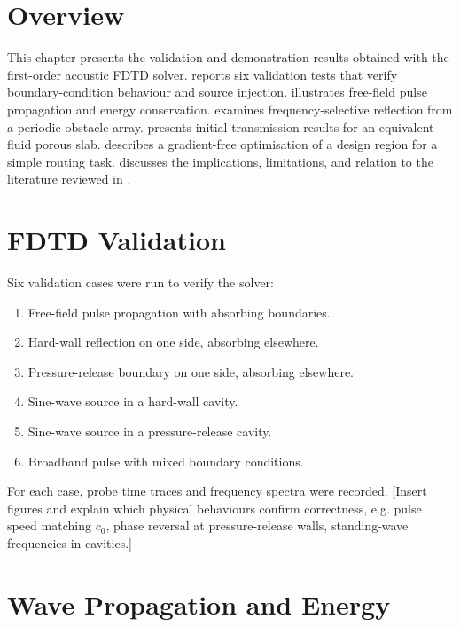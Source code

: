 
\section{Overview}
\label{sec:res_overview}

This chapter presents the validation and demonstration results obtained with the first-order acoustic FDTD solver.  reports six validation tests that verify boundary-condition behaviour and source injection.  illustrates free-field pulse propagation and energy conservation.  examines frequency-selective reflection from a periodic obstacle array.  presents initial transmission results for an equivalent-fluid porous slab.  describes a gradient-free optimisation of a design region for a simple routing task.  discusses the implications, limitations, and relation to the literature reviewed in .

\section{FDTD Validation}
\label{sec:validation}

Six validation cases were run to verify the solver:
\begin{enumerate}
    \item Free-field pulse propagation with absorbing boundaries.
    \item Hard-wall reflection on one side, absorbing elsewhere.
    \item Pressure-release boundary on one side, absorbing elsewhere.
    \item Sine-wave source in a hard-wall cavity.
    \item Sine-wave source in a pressure-release cavity.
    \item Broadband pulse with mixed boundary conditions.
\end{enumerate}

For each case, probe time traces and frequency spectra were recorded. [Insert figures and explain which physical behaviours confirm correctness, e.g. pulse speed matching $c_0$, phase reversal at pressure-release walls, standing-wave frequencies in cavities.]

\section{Wave Propagation and Energy}
\label{sec:wave_propagation}

